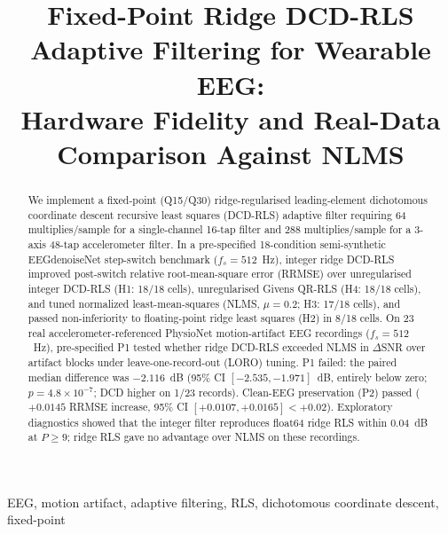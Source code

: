 \documentclass[conference]{IEEEtran}
\begin{document}
\title{Fixed-Point Ridge DCD-RLS Adaptive Filtering for Wearable EEG:\\Hardware Fidelity and Real-Data Comparison Against NLMS}

\author{
}

\date{}
\maketitle

\begin{abstract}
We implement a fixed-point (Q15/Q30) ridge-regularised leading-element dichotomous coordinate descent recursive least squares (DCD-RLS) adaptive filter requiring 64 multiplies/sample for a single-channel 16-tap filter and 288 multiplies/sample for a 3-axis 48-tap accelerometer filter. In a pre-specified 18-condition semi-synthetic EEGdenoiseNet step-switch benchmark ($f_s = 512$~Hz), integer ridge DCD-RLS improved post-switch relative root-mean-square error (RRMSE) over unregularised integer DCD-RLS (H1: 18/18 cells), unregularised Givens QR-RLS (H4: 18/18 cells), and tuned normalized least-mean-squares (NLMS, $\mu = 0.2$; H3: 17/18 cells), and passed non-inferiority to floating-point ridge least squares (H2) in 8/18 cells. On 23 real accelerometer-referenced PhysioNet motion-artifact EEG recordings ($f_s = 512$~Hz), pre-specified P1 tested whether ridge DCD-RLS exceeded NLMS in $\Delta$SNR over artifact blocks under leave-one-record-out (LORO) tuning. P1 failed: the paired median difference was $-2.116$~dB (95\% CI $[-2.535, -1.971]$~dB, entirely below zero; $p = 4.8\times10^{-7}$; DCD higher on 1/23 records). Clean-EEG preservation (P2) passed ($+0.0145$ RRMSE increase, 95\% CI $[+0.0107, +0.0165] < +0.02$). Exploratory diagnostics showed that the integer filter reproduces float64 ridge RLS within 0.04~dB at $P \ge 9$; ridge RLS gave no advantage over NLMS on these recordings.
\end{abstract}

\begin{IEEEkeywords}
EEG, motion artifact, adaptive filtering, RLS, dichotomous coordinate descent, fixed-point
\end{IEEEkeywords}
\end{document}
